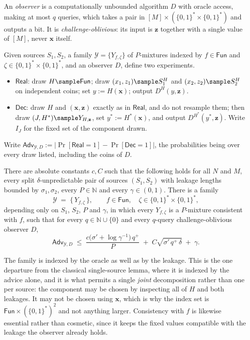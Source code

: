 \documentclass{conjura-conjecture}
\newcommand{\Fun}{\mathsf{Fun}}
\newcommand{\Adv}{\mathsf{Adv}}
\newcommand{\Real}{\mathsf{Real}}
\newcommand{\Dec}{\mathsf{Dec}}
\newcommand{\Prob}[1]{\Pr\!\left[#1\right]}
\newcommand{\bits}{\{0,1\}}
\newcommand{\vx}{\mathbf{x}}
\newcommand{\vz}{\mathbf{z}}
\begin{document}
\begin{definition}\label{def:obs}
An \emph{observer} is a computationally unbounded algorithm $D$ with oracle
access, making at most $q$ queries, which takes a pair in
$[M] \times (\bits^{*} \times \bits^{*})$ and outputs a bit. It is
\emph{challenge-oblivious}: its input is $\vz$ together with a single value
of $[M]$, never $\vx$ itself.

Given sources $S_1,S_2$, a family $\mathcal{Y} = \{Y_{f,\zeta}\}$ of
$P$-mixtures indexed by $f \in \Fun$ and
$\zeta \in \bits^{*}\times\bits^{*}$, and an observer $D$, define two
experiments.
\begin{itemize}
\item $\Real$: draw $H \sample \Fun$; draw
  $(x_1,z_1) \sample S_1^{H}$ and $(x_2,z_2) \sample S_2^{H}$ on
  independent coins; set $y := H(\vx)$; output $D^{H}(y,\vz)$.
\item $\Dec$: draw $H$ and $(\vx,\vz)$ exactly as in $\Real$, and do not
  resample them; then draw $(J,H^{*}) \sample Y_{H,\vz}$, set
  $y^{*} := H^{*}(\vx)$, and output $D^{H^{*}}(y^{*},\vz)$. Write $I_J$ for
  the fixed set of the component drawn.
\end{itemize}
Write
$\Adv_{\mathcal{Y},D} := \bigl|\Prob{\Real = 1} - \Prob{\Dec = 1}\bigr|$,
the probabilities being over every draw listed, including the coins of $D$.
\end{definition}

\begin{conjecture}
\label{conj:main}
There are absolute constants $c, C$ such that the following holds for all
$N$ and $M$, every split $\delta$-unpredictable pair of sources
$(S_1,S_2)$ with leakage lengths bounded by $\sigma_1,\sigma_2$, every
$P \in \mathbb{N}$ and every $\gamma \in (0,1)$. There is a family
\[
  \mathcal{Y} \;=\; \bigl\{\, Y_{f,\zeta} \,\bigr\}, \qquad
  f \in \Fun, \quad \zeta \in \bits^{*}\times\bits^{*},
\]
depending only on $S_1$, $S_2$, $P$ and $\gamma$, in which every
$Y_{f,\zeta}$ is a $P$-mixture consistent with $f$, such that for every
$q \in \mathbb{N}\cup\{0\}$ and every $q$-query challenge-oblivious
observer $D$,
\[
  \Adv_{\mathcal{Y},D} \;\le\;
  \frac{c\bigl(\sigma' + \log \gamma^{-1}\bigr)\,q^{+}}{P}
  \;+\; C\sqrt{\sigma'\,q^{+}\,\delta} \;+\; \gamma .
\]
\end{conjecture}

\begin{remark}\label{rem:index}
The family is indexed by the oracle as well as by the leakage. This is the
one departure from the classical single-source lemma, where it is indexed
by the advice alone, and it is what permits a single \emph{joint}
decomposition rather than one per source: the component may be chosen by
inspecting all of $H$ and both leakages. It may not be chosen using $\vx$,
which is why the index set is $\Fun \times (\bits^{*})^{2}$ and not
anything larger. Consistency with $f$ is likewise essential rather than
cosmetic, since it keeps the fixed values compatible with the leakage the
observer already holds.
\end{remark}
\end{document}
